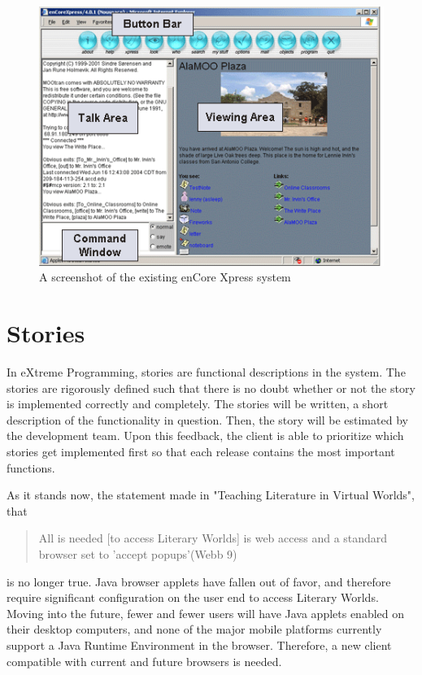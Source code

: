 \documentclass[12pt, letterpaper]{report}
\begin{document}
\par
\begin{figure}[htp]
\centering
\includegraphics{enCoreScreen.png}
\caption{A screenshot of the existing enCore Xpress system}
\label{fig1}
\label{overflow}
\end{figure}

%
\chapter{Stories}
\par
In eXtreme Programming, stories are functional descriptions in the system. The stories are rigorously defined such that there is no doubt whether or not the story is implemented correctly and completely. The stories will be written, a short description of the functionality in question. Then, the story will be estimated by the development team. Upon this feedback, the client is able to prioritize which stories get implemented first so that each release contains the most important functions.

\par
As it stands now, the statement made in "Teaching Literature in Virtual Worlds", that 

\begin{quotation}
All is needed [to access Literary Worlds] is web access and a standard browser set to 'accept popups'(Webb 9)
\end{quotation}
is no longer true. Java browser applets have fallen out of favor, and therefore require significant configuration on the user end to access Literary Worlds. Moving into the future, fewer and fewer users will have Java applets enabled on their desktop computers, and none of the major mobile platforms currently support a Java Runtime Environment in the browser. Therefore, a new client compatible with current and future browsers is needed.
\end{document}

